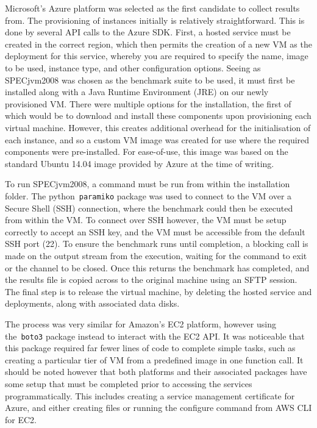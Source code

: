 \documentclass{entcs} \usepackage{entcsmacro}
\begin{document}
Microsoft's Azure platform was selected as the first candidate to collect results from. The provisioning of instances initially is relatively straightforward. This is done by several API calls to the Azure SDK. First, a hosted service must be created in the correct region, which then permits the creation of a new VM as the deployment for this service, whereby you are required to specify the name, image to be used, instance type, and other configuration options. Seeing as SPECjvm2008 was chosen as the benchmark suite to be used, it must first be installed along with a Java Runtime Environment (JRE) on our newly provisioned VM. There were multiple options for the installation, the first of which would be to download and install these components upon provisioning each virtual machine. However, this creates additional overhead for the initialisation of each instance, and so a custom VM image \cite{azurevmimage} was created for use where the required components were pre-installed. For ease-of-use, this image was based on the standard Ubuntu 14.04 image provided by Azure at the time of writing.

To run SPECjvm2008, a command must be run from within the installation folder. The python~\texttt{paramiko} package was used to connect to the VM over a Secure Shell (SSH) connection, where the benchmark could then be executed from within the VM. To connect over SSH however, the VM must be setup correctly to accept an SSH key, and the VM must be accessible from the default SSH port (22). To ensure the benchmark runs until completion, a blocking call is made on the output stream from the execution, waiting for the command to exit or the channel to be closed. Once this returns the benchmark has completed, and the results file is copied across to the original machine using an SFTP session. The final step is to release the virtual machine, by deleting the hosted service and deployments, along with associated data disks.

The process was very similar for Amazon's EC2 platform, however using the~\texttt{boto3} package instead to interact with the EC2 API. It was noticeable that this package required far fewer lines of code to complete simple tasks, such as creating a particular tier of VM from a predefined image in one function call. It should be noted however that both platforms and their associated packages have some setup that must be completed prior to accessing the services programmatically. This includes creating a service management certificate for Azure, and either creating files or running the configure command from AWS CLI for EC2.
\end{document}
